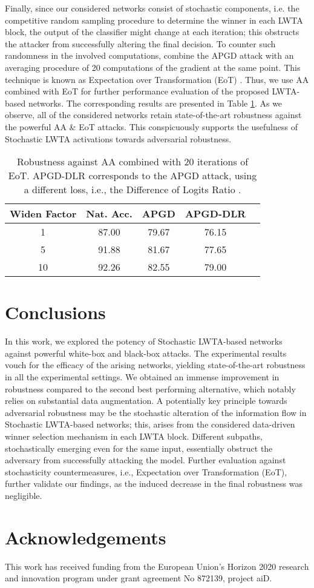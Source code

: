 \documentclass{article}
\begin{document}
	Finally, since our considered networks consist of stochastic components, i.e. the competitive random sampling procedure to determine the winner in each LWTA block, the output of the classifier might change at each iteration; this obstructs the attacker from successfully altering the final decision. To counter such randomness in the involved computations, \cite{croce2020reliable} combine the APGD attack with an averaging procedure of 20 computations of the gradient at the same point. This technique is known as Expectation over Transformation (EoT) \citep{AthalyeC018}. Thus, we use AA combined with EoT for further performance evaluation of the proposed LWTA-based networks. The corresponding results are presented in Table \ref{tab:eot}. As we observe, all of the considered networks retain state-of-the-art robustness against the powerful AA \& EoT attacks. This conspicuously supports the usefulness of Stochastic LWTA activations towards adversarial robustness.
	
	
	\begin{table}[h!]
		\caption{Robustness against AA combined with 20 iterations of EoT. APGD-DLR corresponds to the APGD attack, using a different loss, i.e., the Difference of Logits Ratio \citep{croce2020reliable}.}
		\label{tab:eot}
		\renewcommand{\arraystretch}{1.1}
		\centering
		\begin{tabular}{ccccc}
			\hline
			Widen Factor & Nat. Acc. & APGD & APGD-DLR\\\hline
			1  & 87.00 & 79.67 & 76.15  \\
			5  & 91.88 & 81.67 & 77.65 \\
			10  & 92.26 & 82.55 & 79.00 \\\hline
		\end{tabular}
	\end{table}
	
	
	\section{Conclusions}
	In this work, we explored the potency of Stochastic LWTA-based networks against powerful white-box and black-box attacks. The experimental results vouch for the efficacy of the arising networks, yielding state-of-the-art robustness in all the experimental settings. We obtained an immense improvement in robustness compared to the second best performing alternative, which notably relies on substantial data augmentation. A potentially key principle towards adversarial robustness may be the stochastic alteration of the information flow in Stochastic LWTA-based networks; this, arises from the considered data-driven winner selection mechanism in each LWTA block. Different subpaths, stochastically emerging even for the same input, essentially obstruct the adversary from successfully attacking the model. Further evaluation against stochasticity countermeasures, i.e., Expectation over Transformation (EoT), further validate our findings, as the induced decrease in the final robustness was negligible.
	
	
	\section*{Acknowledgements}
	
	This work has received funding from the European Union's Horizon 2020 research and innovation program
	under grant agreement No 872139, project aiD.
	
	
	
\end{document}
